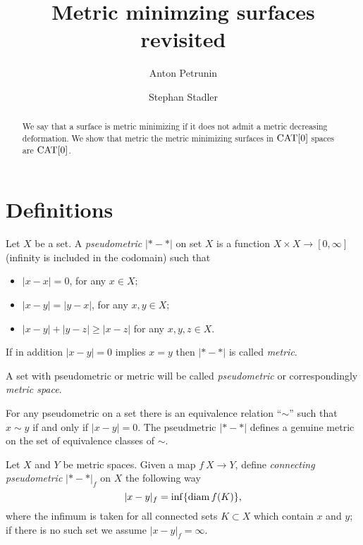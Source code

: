 \documentclass[a4paper,10pt]{amsart}
\begin{document}
\title{Metric minimzing surfaces revisited}
\author{Anton Petrunin}
\address{A. Petrunin\newline\vskip-4mm
Math. Dept. PSU,
University Park, PA 16802,
USA}
\author{Stephan Stadler}


\date{}

\begin{abstract}
We say that a surface is metric minimizing if it does not admit a metric decreasing deformation.
We show that metric the metric minimizing surfaces in $\mathop{\rm CAT}\nolimits[0]$ spaces are $\mathop{\rm CAT}\nolimits[0]$.
\end{abstract}
\maketitle



\section{Definitions}

Let $X$ be a set.
A \emph{pseudometric} $|{*}-{*}|$ on set $X$ 
is a function $X\times X\to[0,\infty]$ (infinity is included in the codomain)
such that 
\begin{itemize}
\item $|x-x|=0$, for any $x\in X$;
\item $|x-y|=|y-x|$, for any $x,y\in X$;
\item $|x-y|+|y-z|\ge|x-z|$ for any  $x,y,z\in X$.
\end{itemize}

If in addition $|x-y|=0$ implies $x=y$ then $|{*}-{*}|$ is called \emph{metric}.


A set with pseudometric or metric will be called \emph{pseudometric} or correspondingly \emph{metric space}.

For any pseudometric on a set 
there is an equivalence relation ``$\sim$''
such that $x\sim y$ if and only if $|x-y|=0$.
The pseudmetric $|{*}-{*}|$ defines a genuine metric on the set of equivalence classes of $\sim$.

Let $X$ and $Y$ be metric spaces.
Given a map $f\:X\to Y$,
define \emph{connecting pseudometric} $|{*}-{*}|_f$ on $X$ 
the following way
\[|x-y|_f=\inf\{\mathop{\rm diam}\nolimits f(K)\},\]
where the infimum is taken for all connected sets $K\subset X$ which contain $x$ and $y$;
if there is no such set we assume $|x-y|_f=\infty$.
\end{document}
